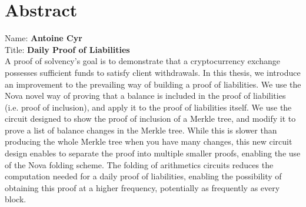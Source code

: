 
\chapter*{Abstract}

Name: 	\tab \textbf{Antoine Cyr} \\
Title: 	\tab \textbf{Daily Proof of Liabilities}\\

A proof of solvency's goal is to demonstrate that a cryptocurrency exchange possesses sufficient funds to satisfy client withdrawals. In this thesis, we introduce an improvement to the prevailing way of building a proof of liabilities. We use the Nova novel way of proving that a balance is included in the proof of liabilities (i.e. proof of inclusion), and apply it to the proof of liabilities itself.
We use the circuit designed to show the proof of inclusion of a Merkle tree, and modify it to prove a list of balance changes in the Merkle tree. While this is slower than producing the whole Merkle tree when you have many changes, this new circuit design enables to separate the proof into multiple smaller proofs, enabling the use of the Nova folding scheme. The folding of arithmetics circuits reduces the computation needed for a daily proof of liabilities, enabling the possibility of obtaining this proof at a higher frequency, potentially as frequently as every block.



